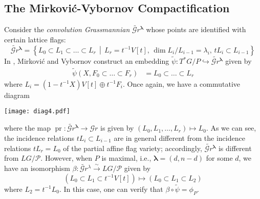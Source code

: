 \documentclass[paper=a4, fontsize=10pt]{amsart} %
\theoremstyle{plain}
\theoremstyle{definition}
\theoremstyle{remark}
\numberwithin{equation}{section} %
\numberwithin{figure}{section} %
\numberwithin{table}{section} %
\numberwithin{subsection}{section} %
\def\mid{\,\middle\vert\,}
\def\gl{\ensuremath{G}}
\def\gL{\ensuremath{L\gl}}
\def\gLhat{\gL}
\def\para{\ensuremath{P}}
\def\Para{\ensuremath{\mathcal P}}
\def\Ni{\ensuremath{\mathcal N}}
\begin{document}
\subsection{The Mirkovi\'c-Vybornov Compactification}
\label{mv}
Consider the \emph{convolution Grassmannian} $\widetilde{\mathcal Gr}{}^{\boldsymbol\lambda}$ whose points are identified with certain lattice flags:
$$\widetilde{\mathcal Gr}{}^{\boldsymbol\lambda}=\left\{L_0\subset L_1\subset\ldots\subset L_r\mid L_r=t^{-1}V[t],\,\dim L_i/L_{i-1}=\lambda_i,\,tL_i\subset L_{i-1}\right\} $$
In \cite{mv}, Mirkovi\'c and Vybornov construct an embedding $\widetilde\psi:T^*G/P\hookrightarrow\widetilde{\mathcal Gr}{}^{\boldsymbol\lambda}$ given by \begin{align*}
    \widetilde\psi(X,F_0\subset\ldots\subset F_r)   &=L_0\subset\ldots\subset L_r
\end{align*}
where $L_i=(1-t^{-1}X)V[t]\oplus t^{-1}F_i$.
Once again, we have a commutative diagram\begin{center}
\texttt{[image: diag4.pdf]}
\end{center}
where the map $\operatorname{pr}:\widetilde{\mathcal Gr}{}^{\boldsymbol\lambda}\rightarrow\mathcal Gr$ is given by $(L_0,L_1,\ldots,L_r)\mapsto L_0$.
As we can see, the incidence relations $tL_i\subset L_{i-1}$ are in general different from the incidence relations $tL_r=L_0$ of the partial affine flag variety; accordingly, $\widetilde{\mathcal Gr}{}^{\boldsymbol\lambda}$ is different from $\gLhat/\Para$.
However, when $P$ is maximal, i.e., $\boldsymbol\lambda=(d,n-d)$ for some $d$, we have an isomorphism $\beta:\widetilde{\mathcal Gr}{}^\lambda\xrightarrow\sim\gLhat/\Para$ given by 
$$(L_0\subset L_1\subset t^{-1}V[t])\mapsto (L_0\subset L_1\subset L_2)$$
where $L_2=t^{-1}L_0$.
In this case, one can verify that $\beta\circ\widetilde\psi=\phi_P$.
\end{document}
